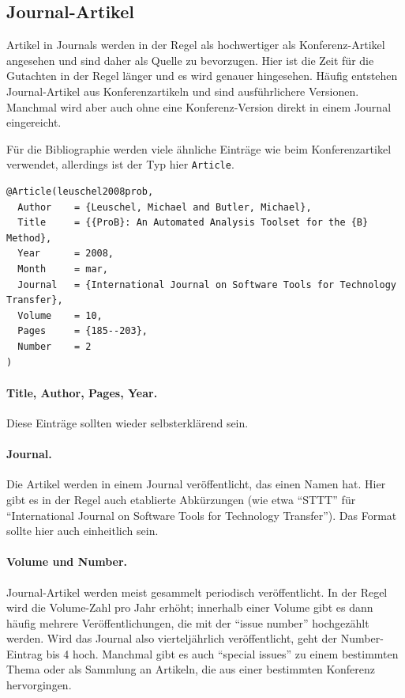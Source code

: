 \subsection{Journal-Artikel}

Artikel in Journals werden in der Regel als hochwertiger als Konferenz-Artikel angesehen
und sind daher als Quelle zu bevorzugen.
Hier ist die Zeit für die Gutachten in der Regel länger und es wird genauer hingesehen.
Häufig entstehen Journal-Artikel aus Konferenzartikeln und sind ausführlichere Versionen.
Manchmal wird aber auch ohne eine Konferenz-Version direkt in einem Journal eingereicht.

Für die Bibliographie werden viele ähnliche Einträge wie beim Konferenzartikel verwendet,
allerdings ist der Typ hier \verb|Article|.

\begin{verbatim}
@Article(leuschel2008prob,
  Author	= {Leuschel, Michael and Butler, Michael},
  Title		= {{ProB}: An Automated Analysis Toolset for the {B} Method},
  Year		= 2008,
  Month		= mar,
  Journal	= {International Journal on Software Tools for Technology Transfer},
  Volume	= 10,
  Pages		= {185--203},
  Number	= 2
)
\end{verbatim}

\paragraph{Title, Author, Pages, Year.} Diese Einträge sollten wieder selbsterklärend sein.
\paragraph{Journal.} Die Artikel werden in einem Journal veröffentlicht, das einen Namen hat.
Hier gibt es in der Regel auch etablierte Abkürzungen (wie etwa \enquote{STTT} für 
\enquote{International Journal on Software Tools for Technology Transfer}).
Das Format sollte hier auch einheitlich sein.
\paragraph{Volume und Number.} Journal-Artikel werden meist gesammelt periodisch veröffentlicht.
In der Regel wird die Volume-Zahl pro Jahr erhöht;
innerhalb einer Volume gibt es dann häufig mehrere Veröffentlichungen, die mit der \enquote{issue number} hochgezählt werden.
Wird das Journal also vierteljährlich veröffentlicht, geht der Number-Eintrag bis 4 hoch.
Manchmal gibt es auch \enquote{special issues} zu einem bestimmten Thema oder als Sammlung an Artikeln,
die aus einer bestimmten Konferenz hervorgingen.

